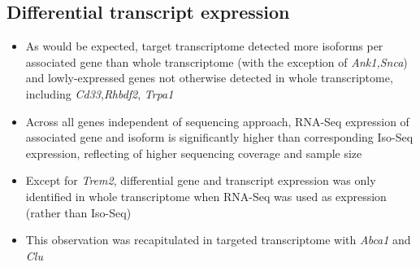 \subsection{Differential transcript expression}

\begin{itemize}
	\item As would be expected, target transcriptome detected more isoforms per associated gene than whole transcriptome (with the exception of \textit{Ank1,Snca}) and lowly-expressed genes not otherwise detected in whole transcriptome, including \textit{Cd33},\textit{Rhbdf2}, \textit{Trpa1}
	\item Across all genes independent of sequencing approach, RNA-Seq expression of associated gene and isoform is significantly higher than corresponding Iso-Seq expression, reflecting of higher sequencing coverage and sample size 
	\item Except for \textit{Trem2}, differential gene and transcript expression was only identified in whole transcriptome when RNA-Seq was used as expression (rather than Iso-Seq)
	\item This observation was recapitulated in targeted transcriptome with \textit{Abca1} and \textit{Clu}
\end{itemize}

